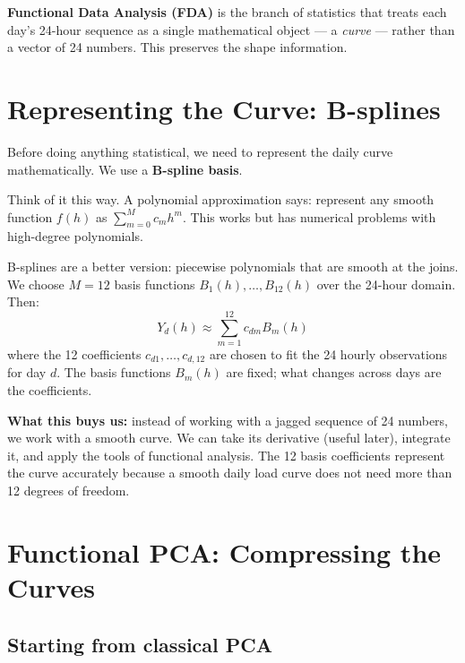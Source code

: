 \documentclass[11pt,a4paper]{article}
\begin{document}
\textbf{Functional Data Analysis (FDA)} is the branch of statistics that
treats each day's 24-hour sequence as a single mathematical object --- a
\emph{curve} --- rather than a vector of 24 numbers. This preserves the
shape information.

\section{Representing the Curve: B-splines}

Before doing anything statistical, we need to represent the daily curve
mathematically. We use a \textbf{B-spline basis}.

Think of it this way. A polynomial approximation says: represent any
smooth function $f(h)$ as $\sum_{m=0}^{M} c_m h^m$. This works but
has numerical problems with high-degree polynomials.

B-splines are a better version: piecewise polynomials that are smooth
at the joins. We choose $M = 12$ basis functions $B_1(h), \ldots, B_{12}(h)$
over the 24-hour domain. Then:
\[
Y_d(h) \approx \sum_{m=1}^{12} c_{dm} B_m(h)
\]
where the 12 coefficients $c_{d1}, \ldots, c_{d,12}$ are chosen to fit
the 24 hourly observations for day $d$. The basis functions $B_m(h)$ are
fixed; what changes across days are the coefficients.

\begin{keybox}
\textbf{What this buys us:} instead of working with a jagged sequence of
24 numbers, we work with a smooth curve. We can take its derivative
(useful later), integrate it, and apply the tools of functional analysis.
The 12 basis coefficients represent the curve accurately because a
smooth daily load curve does not need more than 12 degrees of freedom.
\end{keybox}

\section{Functional PCA: Compressing the Curves}

\subsection{Starting from classical PCA}
\end{document}
